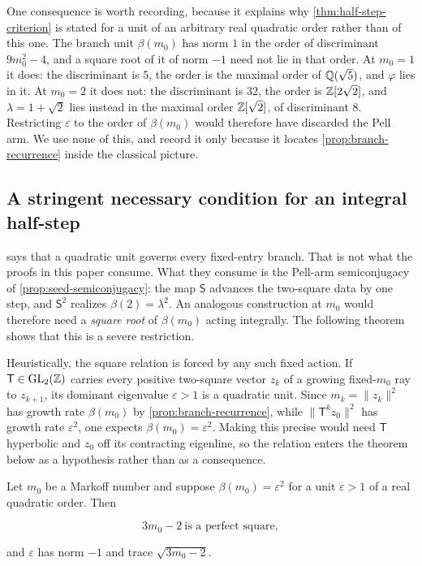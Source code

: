 \begin{remark}
One consequence is worth recording, because it explains why
\cref{thm:half-step-criterion} is stated for a unit of an arbitrary real
quadratic order rather than of this one. The branch unit $\beta(m_0)$ has norm
$1$ in the order of discriminant $9m_0^2-4$, and a square root of it of norm
$-1$ need not lie in that order. At $m_0=1$ it does: the discriminant is $5$,
the order is the maximal order of $\mathbb{Q}(\sqrt5)$, and $\varphi$ lies in it. At
$m_0=2$ it does not: the discriminant is $32$, the order is $\mathbb{Z}[2\sqrt2]$, and
$\lambda=1+\sqrt2$ lies instead in the maximal order $\mathbb{Z}[\sqrt2]$, of
discriminant $8$. Restricting $\varepsilon$ to the order of $\beta(m_0)$ would
therefore have discarded the Pell arm. We use none of this, and record it only
because it locates \cref{prop:branch-recurrence} inside the classical
picture.
\end{remark}

\subsection{A stringent necessary condition for an integral half-step}

 says that a quadratic unit governs every
fixed-entry branch. That is not what the proofs in this paper consume. What
they consume is the Pell-arm semiconjugacy of
\cref{prop:seed-semiconjugacy}: the map $\mathsf S$ advances the two-square
data by one step, and $\mathsf S^2$ realizes
$\beta(2)=\lambda^2$. An analogous construction at $m_0$ would therefore
need a \emph{square root} of $\beta(m_0)$ acting integrally. The following
theorem shows that this is a severe restriction.

Heuristically, the square relation is forced by any such fixed action. If
$\mathsf T\in\mathrm{GL}_2(\mathbb{Z})$ carries every positive two-square vector
$z_k$ of a growing fixed-$m_0$ ray to $z_{k+1}$, its dominant eigenvalue
$\varepsilon>1$ is a quadratic unit. Since
$m_k=\lVert z_k\rVert^2$ has growth rate $\beta(m_0)$ by
\cref{prop:branch-recurrence}, while $\lVert\mathsf T^kz_0\rVert^2$ has
growth rate $\varepsilon^2$, one expects
$\beta(m_0)=\varepsilon^2$. Making this precise would need $\mathsf T$
hyperbolic and $z_0$ off its contracting eigenline, so the relation enters
the theorem below as a hypothesis rather than as a consequence.

\begin{theorem}
\label{thm:half-step-criterion}
Let $m_0$ be a Markoff number and suppose $\beta(m_0)=\varepsilon^2$ for a
unit $\varepsilon>1$ of a real quadratic order. Then

\begin{equation}
 3m_0-2\ \text{is a perfect square},
 \label{eq:half-step-criterion}
\end{equation}

and $\varepsilon$ has norm $-1$ and trace $\sqrt{3m_0-2}$.
\end{theorem}


